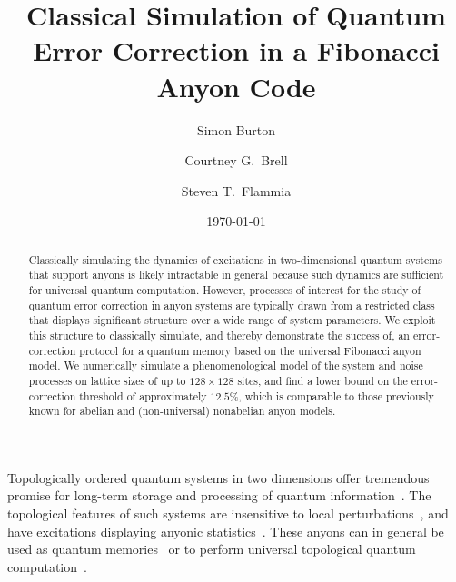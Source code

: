 \documentclass[aps, prl, letterpaper, twocolumn, superscriptaddress, notitlepage, 10pt]{revtex4-1}
\begin{document}
\title{Classical Simulation of Quantum Error Correction in a Fibonacci Anyon Code}

\author{Simon Burton}
\author{Courtney G.\ Brell}
\author{Steven T.\ Flammia}

\date{\today}

\begin{abstract}
Classically simulating the dynamics of excitations in two-dimensional quantum systems that 
support anyons is likely intractable in general because such dynamics are sufficient for 
universal quantum computation. However, processes of interest for the study of quantum 
error correction in anyon systems are typically drawn from a restricted class that displays 
significant structure over a wide range of system parameters.
We exploit this structure to classically simulate, and thereby demonstrate the success of, an 
error-correction protocol for a quantum memory based on the universal Fibonacci anyon 
model.  We numerically simulate a phenomenological model of the system and noise 
processes on lattice sizes of up to 
$128\times128$ sites, and find a lower bound on the error-correction threshold of 
approximately $12.5\%$, which is comparable to those previously known for abelian and 
(non-universal) nonabelian anyon models.
\end{abstract}

\maketitle


Topologically ordered quantum systems in two dimensions offer tremendous promise for 
long-term storage and processing of quantum information~\cite{Kitaev2003, Dennis2002, Nayak2008}. 
The topological features of such systems are insensitive to local 
perturbations~\cite{Bravyi2010, Bravyi2011a, Michalakis2013}, and have excitations 
displaying anyonic statistics~\cite{Wilczek1990}. These anyons can in general be used as 
quantum memories~\cite{Kitaev2003, Dennis2002} or to perform universal topological 
quantum computation~\cite{Freedman2002, Nayak2008}.
\end{document}

